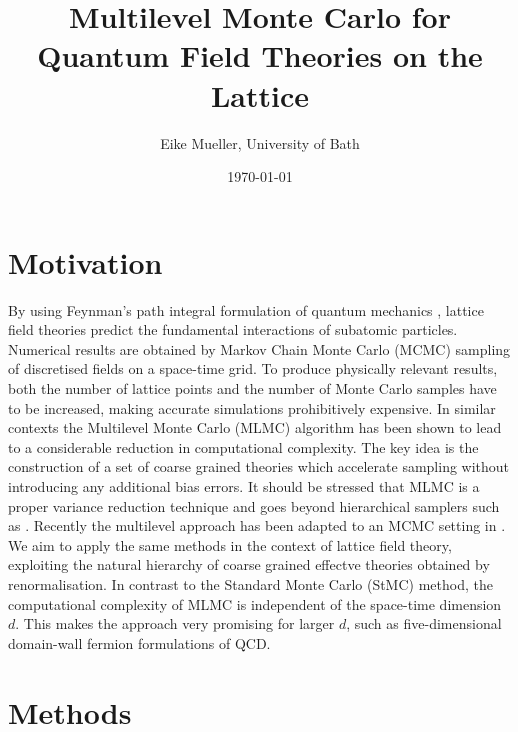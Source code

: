\documentclass[11pt]{article}
\author{Eike Mueller, University of Bath}
\date{\today}
\title{Multilevel Monte Carlo for Quantum Field Theories on the Lattice}
\begin{document}
\maketitle
\section{Motivation}
By using Feynman's path integral formulation of quantum mechanics \cite{Feynman2010}, lattice field theories predict the fundamental interactions of subatomic particles. Numerical results are obtained by Markov Chain Monte Carlo (MCMC) sampling of discretised fields on a space-time grid. To produce physically relevant results, both the number of lattice points and the number of Monte Carlo samples have to be increased, making accurate simulations prohibitively expensive. In similar contexts the Multilevel Monte Carlo (MLMC) algorithm \cite{Giles2015} has been shown to lead to a considerable reduction in computational complexity. The key idea is the construction of a set of coarse grained theories which accelerate sampling without introducing any additional bias errors. It should be stressed that MLMC is a proper variance reduction technique and goes beyond hierarchical samplers such as \cite{Faas1986}.
Recently the multilevel approach has been adapted to an MCMC setting in \cite{Dodwell2015}. We aim to apply the same methods in the context of lattice field theory, exploiting the natural hierarchy of coarse grained effectve theories obtained by renormalisation. In contrast to the Standard Monte Carlo (StMC) method, the computational complexity of MLMC is independent of the space-time dimension $d$. This makes the approach very promising for larger $d$, such as five-dimensional domain-wall fermion formulations \cite{Kaplan1992} of QCD. 
\section{Methods}

\end{document}

